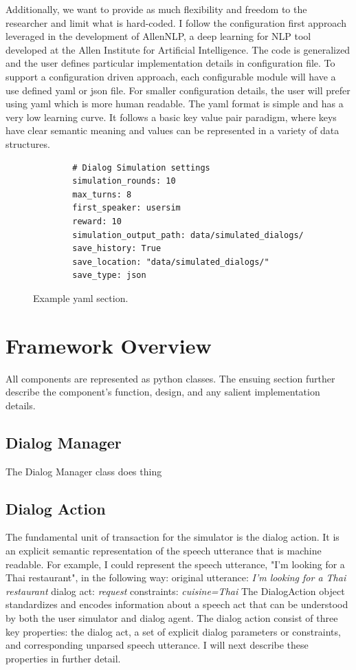 Additionally, we want to provide as much flexibility and freedom to the researcher and limit what is hard-coded. I follow the configuration first approach leveraged in the development of AllenNLP, a deep learning for NLP tool developed at the Allen Institute for Artificial Intelligence. The code is generalized and the user defines particular implementation details in configuration file. To support a configuration driven approach, each configurable module will have a use defined yaml or json file. For smaller configuration details, the user will prefer using yaml which is more human readable. The yaml format is simple and has a very low learning curve. It follows a basic key value pair paradigm, where keys have clear semantic meaning and values can be represented in a variety of data structures. 

\begin{figure}[h!]
	\caption{Example yaml section. }
	\label{fig:ex_yaml}
	\begin{lstlisting}
		# Dialog Simulation settings
		simulation_rounds: 10
		max_turns: 8
		first_speaker: usersim
		reward: 10
		simulation_output_path: data/simulated_dialogs/
		save_history: True
		save_location: "data/simulated_dialogs/"
		save_type: json
	\end{lstlisting}
\end{figure}

\section{ Framework Overview}

All components are represented as python classes. The ensuing section further describe the component's function, design, and any salient implementation details. 

\subsection{Dialog  Manager}

The Dialog Manager class does thing

\subsection{Dialog Action}

The fundamental unit of transaction for the simulator is the dialog action. It is an explicit semantic representation of the speech utterance that is machine readable. For example, I could represent the speech utterance, "I'm looking for a  Thai restaurant", in the following way:
	original utterance: \textit{I'm looking for a Thai restaurant}
	dialog act: \textit{request}
	constraints: \textit{cuisine=Thai}
The DialogAction object standardizes and encodes information about a speech act that can be understood by both the user simulator and dialog agent. The dialog action consist of three key properties: the dialog act, a set of explicit dialog parameters or constraints, and corresponding unparsed speech utterance. I will next describe these properties in further detail. 

